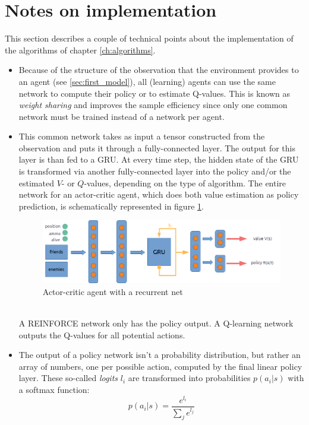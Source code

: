 \section{Notes on implementation}
This section describes a couple of technical points about the implementation of the algorithms of chapter \ref{ch:algorithms}.
\begin{itemize}
    \item Because of the structure of the observation that the environment provides to an agent (see \ref{sec:first_model}), all (learning) agents can use the same network to compute their policy or to estimate Q-values. This is known as \emph{weight sharing} and improves the sample efficiency since only one common network must be trained instead of a network per agent.
    \item This common network takes as input a tensor constructed from the observation and puts it through a fully-connected layer. The output for this layer is than fed to a GRU. At every time step, the hidden state of the GRU is transformed via another fully-connected layer into the policy and/or the estimated $V$- or $Q$-values, depending on the type of algorithm. The entire network for an actor-critic agent, which does both value estimation as policy prediction, is schematically represented in figure \ref{fig:agent_net}. 
    \begin{figure}[htp]
        \centering
        \includegraphics[width=14cm]{images/agent_net2.png}
        \caption{Actor-critic agent with a recurrent net}
        \label{fig:agent_net}
    \end{figure}
    \\A REINFORCE network only has the policy output. A Q-learning network outputs the Q-values for all potential actions.
    \item
        The output of a policy network isn't a probability distribution, but rather an array of numbers, one per possible action, computed by the final linear policy layer. These so-called \emph{logits} $l_i$ are transformed into probabilities $p(a_i | s)$ with a softmax function:
        \begin{equation}
            p(a_i | s) = \frac{e^{l_i}}{\sum_j e^{l_j}}

\end{equation}
\end{itemize}
